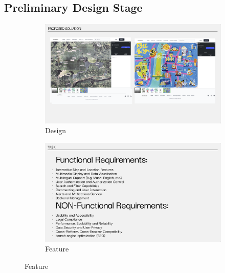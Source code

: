 ﻿%

\subsection{Preliminary Design Stage}
\begin{figure}[H]
  \centering
  \begin{subfigure}[b]{0.3\textwidth}
    \includegraphics[width=\textwidth]{screenshot/priliminary_design.png}
    \caption{Design}
  \end{subfigure}\hfill
  \begin{subfigure}[b]{0.3\textwidth}
    \includegraphics[width=\textwidth]{screenshot/priliminary_feature.png}
    \caption{Feature}
  \end{subfigure}\hfill

\end{figure}
